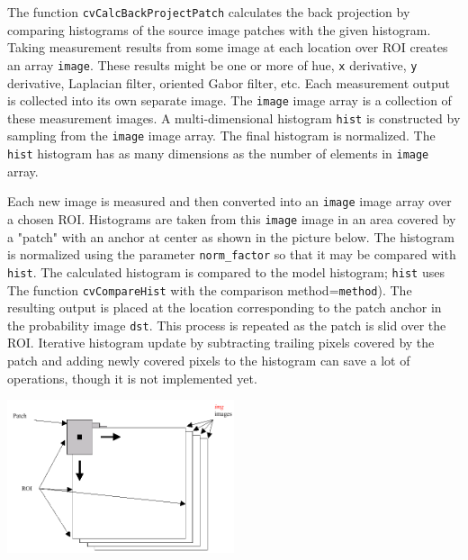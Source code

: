 \begin{description}
\end{description}

The function \texttt{cvCalcBackProjectPatch} calculates the back projection by comparing histograms of the source image patches with the given histogram. Taking measurement results from some image at each location over ROI creates an array \texttt{image}. These results might be one or more of hue, \texttt{x} derivative, \texttt{y} derivative, Laplacian filter, oriented Gabor filter, etc. Each measurement output is collected into its own separate image. The \texttt{image} image array is a collection of these measurement images. A multi-dimensional histogram \texttt{hist} is constructed by sampling from the \texttt{image} image array. The final histogram is normalized. The \texttt{hist} histogram has as many dimensions as the number of elements in \texttt{image} array.

Each new image is measured and then converted into an \texttt{image} image array over a chosen ROI. Histograms are taken from this \texttt{image} image in an area covered by a "patch" with an anchor at center as shown in the picture below. The histogram is normalized using the parameter \texttt{norm\_factor} so that it may be compared with \texttt{hist}. The calculated histogram is compared to the model histogram; \texttt{hist} uses The function \texttt{cvCompareHist} with the comparison method=\texttt{method}). The resulting output is placed at the location corresponding to the patch anchor in the probability image \texttt{dst}. This process is repeated as the patch is slid over the ROI. Iterative histogram update by subtracting trailing pixels covered by the patch and adding newly covered pixels to the histogram can save a lot of operations, though it is not implemented yet.


\includegraphics[width=0.5\textwidth]{pics/backprojectpatch.png}

